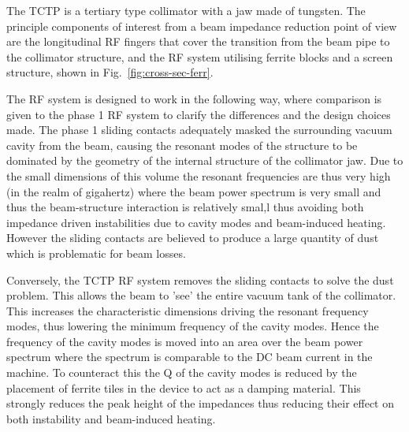 The TCTP is a tertiary type collimator with a jaw made of tungsten. The principle components of interest from a beam impedance reduction point of view are the longitudinal RF fingers that cover the transition from the beam pipe to the collimator structure, and the RF system utilising ferrite blocks and a screen structure, shown in Fig.~\ref{fig:cross-sec-ferr}.

The RF system is designed to work in the following way, where comparison is given to the phase 1 RF system to clarify the differences and the design choices made. The phase 1 sliding contacts adequately masked the surrounding vacuum cavity from the beam, causing the resonant modes of the structure to be dominated by the geometry of the internal structure of the collimator jaw. Due to the small dimensions of this volume the resonant frequencies are thus very high (in the realm of gigahertz) where the beam power spectrum is very small and thus the beam-structure interaction is relatively smal,l thus avoiding both impedance driven instabilities due to cavity modes and beam-induced heating. However the sliding contacts are believed to produce a large quantity of dust which is problematic for beam losses.

Conversely, the TCTP RF system removes the sliding contacts to solve the dust problem. This allows the beam to 'see' the entire vacuum tank of the collimator. This increases the characteristic dimensions driving the resonant frequency modes, thus lowering the minimum frequency of the cavity modes. Hence the frequency of the cavity modes is moved into an area over the beam power spectrum where the spectrum is comparable to the DC beam current in the machine. To counteract this the Q of the cavity modes is reduced by the placement of ferrite tiles in the device to act as a damping material. This strongly reduces the peak height of the impedances thus reducing their effect on both instability and beam-induced heating.